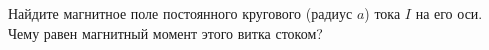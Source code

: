 \documentclass[__main__.tex]{subfiles}
\begin{document}
Найдите магнитное поле постоянного кругового (радиус $a$) тока $I$ на его оси. Чему равен магнитный момент этого витка стоком?\\ 

\end{document}
